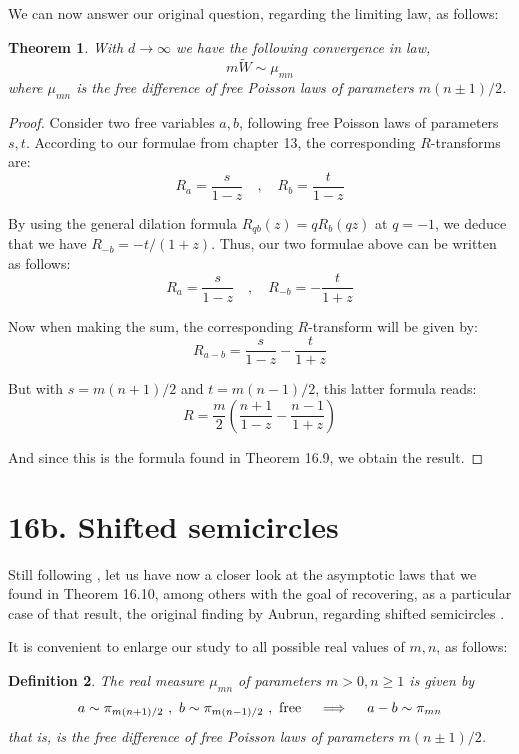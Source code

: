 \documentclass[12pt]{amsbook}
\newtheorem{theorem}{Theorem}[chapter]
\newtheorem{definition}[theorem]{Definition}
\begin{document}
We can now answer our original question, regarding the limiting law, as follows:

\begin{theorem}
With $d\to\infty$ we have the following convergence in law,
$$m\widetilde{W}\sim\mu_{mn}$$
where $\mu_{mn}$ is the free difference of free Poisson laws of parameters $m(n\pm 1)/2$.
\end{theorem}

\begin{proof}
Consider two free variables $a,b$, following free Poisson laws of parameters $s,t$. According to our formulae from chapter 13, the corresponding $R$-transforms are:
$$R_a=\frac{s}{1-z}\quad,\quad R_b=\frac{t}{1-z}$$

By using the general dilation formula $R_{qb}(z)=qR_b(qz)$  at $q=-1$, we deduce that we have $R_{-b}=-t/(1+z)$. Thus, our two formulae above can be written as follows:
$$R_a=\frac{s}{1-z}\quad,\quad R_{-b}=-\frac{t}{1+z}$$

Now when making the sum, the corresponding $R$-transform will be given by:
$$R_{a-b}=\frac{s}{1-z}-\frac{t}{1+z}$$

But with $s=m(n+1)/2$ and $t=m(n-1)/2$, this latter formula reads:
$$R=\frac{m}{2}\left(\frac{n+1}{1-z}-\frac{n-1}{1+z}\right)$$

And since this is the formula found in Theorem 16.9, we obtain the result.
\end{proof}

\section*{16b. Shifted semicircles}

Still following \cite{bn1}, let us have now a closer look at the asymptotic laws that we found in Theorem 16.10, among others with the goal of recovering, as a particular case of that result, the original finding by Aubrun, regarding shifted semicircles \cite{aub}.

\bigskip

It is convenient to enlarge our study to all possible real values of $m,n$, as follows:

\begin{definition}
The real measure $\mu_{mn}$ of parameters $m>0,n\geq 1$ is given by
$$a\sim\pi_{m(n+1)/2}\ ,\ b\sim\pi_{m(n-1)/2}\ ,\ {\rm free}\quad\implies\quad a-b\sim\pi_{mn}$$
that is, is the free difference of free Poisson laws of parameters $m(n\pm 1)/2$.
\end{definition}
\end{document}
